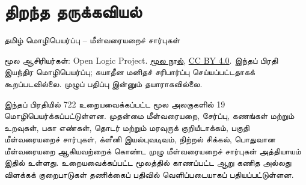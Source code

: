 \documentclass[11pt,a4paper,openany]{memoir}
\begin{document}
\raggedright
\pagestyle{plain}
\chapter*{திறந்த தருக்கவியல்}
\noindent தமிழ் மொழிபெயர்ப்பு -- மீள்வரையறைச் சார்புகள்

\noindent மூல ஆசிரியர்கள்: Open Logic Project.
\href{https://github.com/OpenLogicProject/OpenLogic}{மூல நூல்},
\href{https://creativecommons.org/licenses/by/4.0/}{CC BY 4.0}.
இந்தப் பிரதி இயந்திர மொழிபெயர்ப்பு; சுயாதீன மனிதச் சரிபார்ப்பு செய்யப்பட்டதாகக்
கூறப்படவில்லை. முழுப் பதிப்பு இன்னும் தயாராகவில்லை.

\noindent இந்தப் பிரதியில் 722 உறையவைக்கப்பட்ட மூல அலகுகளில் 19
மொழிபெயர்க்கப்பட்டுள்ளன. முதன்மை மீள்வரையறை, சேர்ப்பு, கணங்கள் மற்றும்
உறவுகள், பகா எண்கள், தொடர் மற்றும் மரவுருக் குறியீடாக்கம், பகுதி
மீள்வரையறைச் சார்புகள், க்ளீனி இயல்புவடிவம், நிற்றல் சிக்கல்,
பொதுவான மீள்வரையறை ஆகியவற்றைக் கொண்ட முழு மீள்வரையறைச் சார்புகள்
அத்தியாயம் இதில் உள்ளது. உறையவைக்கப்பட்ட மூலத்தில் காணப்பட்ட ஆறு
கணித அல்லது விளக்கக் குறைபாடுகள் தணிக்கைப் பதிவில் வெளிப்படையாகப்
பதியப்பட்டுள்ளன.

\clearpage
\tableofcontents*

\end{document}
